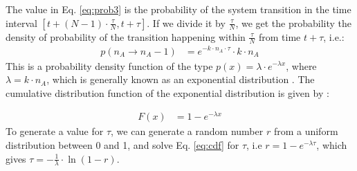 \documentclass[12pt]{article}
\begin{document}
The value in Eq. \ref{eq:prob3} is the probability of the system transition in the time interval $[t+(N-1) \cdot \frac \tau N,t+\tau]$. If we divide it by $\frac\tau N$, we get the probability the density of probability of the transition happening within $\frac \tau N$ from time $t+\tau$, i.e.:
\begin{align}
p(n_A \rightarrow n_A-1) &= e^{-k \cdot n_A \cdot \tau} \cdot k \cdot n_A  
\label{eq:prob4}
\end{align}
This is a probability density function of the type $p(x) = \lambda \cdot e^{-\lambda x}$, where $\lambda = k \cdot n_A$, which is generally known as an exponential distribution \cite{introProb2005}. The cumulative distribution function of the exponential distribution is given by \cite{introProb2005}:

\begin{align}
F(x) &= 1-e^{-\lambda x}
\label{eq:cdf}
\end{align}
To generate a value for $\tau$, we can generate a random number $r$ from a uniform distribution between 0 and 1, and solve Eq. \ref{eq:cdf} for $\tau$, i.e $r = 1-e^{-\lambda \tau}$, which gives $\tau = -\frac 1 \lambda \cdot \ln(1-r)$. 
\end{document}

